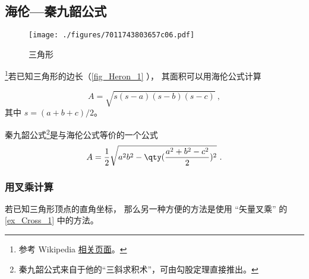 

\subsection{海伦—秦九韶公式}
\begin{figure}[ht]
\centering
\texttt{[image: ./figures/7011743803657c06.pdf]}
\caption{三角形} \label{fig_Heron_1}
\end{figure}
\footnote{参考 Wikipedia \href{https://en.wikipedia.org/wiki/Heron's_formula}{相关页面}。}若已知三角形的边长（\autoref{fig_Heron_1} ）， 其面积可以用海伦公式计算

\begin{equation}\label{eq_Heron_1}
A = \sqrt{s(s-a)(s-b)(s-c)}~,
\end{equation}
其中 $s = (a+b+c)/2$。

秦九韶公式\footnote{秦九韶公式来自于他的“三斜求积术”，可由勾股定理直接推出。}是与海伦公式等价的一个公式
\begin{equation}
A = \frac{1}{2}\sqrt{a^2b^2-\qty(\frac{a^2+b^2-c^2}{2})^2}~.
\end{equation}

\subsubsection{用叉乘计算}
若已知三角形顶点的直角坐标， 那么另一种方便的方法是使用 “矢量叉乘” 的\autoref{ex_Cross_1} 中的方法。

